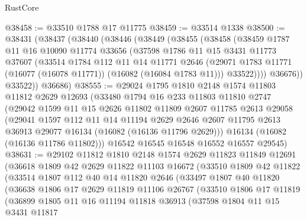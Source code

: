 \begin{lexlean}{RustCore}
\begin{coremodule}
@38458 := @33510 @1788 @17 @11775
@38459 := @33514 @1338
@38500 := @38431
    (@38437
      (@38440
        (@38446
          (@38449
            (@38455
              (@38458
                (@38459
                  @1787
                  @11
                  @16
                  @10090
                  @11774
                  @33656
                  (@37598
                    @1786
                    @11
                    @15
                    @3431
                    @11773
                    @37607
                    (@33514
                      @1784
                      @112
                      @11
                      @14
                      @11771
                      @2646
                      (@29071 @1783 @11771 (@16077 (@16078 @11771)) (@16082 (@16084 @1783 @11)))
                      @33522))))
              @36676))
          @33522))
      @36686)
@38555 := @29024
    @1795
    @1810
    @2148
    @1574
    @11803
    @11812
    @2629
    @12693
    (@33480
      @1794
      @16
      @233
      @11803
      @11810
      @2747
      (@29042
        @1599
        @11
        @15
        @2626
        @11802
        @11809
        @2607
        @11785
        @2613
        @29058
        (@29041
          @1597
          @112
          @11
          @14
          @11194
          @2629
          @2646
          @2607
          @11795
          @2613
          @36913
          @29077
          @16134
          (@16082 (@16136 @11796 @2629)))
        @16134
        (@16082 (@16136 @11786 @11802)))
      @16542
      @16545
      @16548
      @16552
      @16557
      @29545)
@38631 := @29102
    @11812
    @1810
    @2148
    @1574
    @2629
    @11823
    @11849
    @12691
    (@36618
      @1809
      @42
      @2629
      @11822
      @11103
      @16672
      (@33510
        @1809
        @42
        @11822
        (@33514
          @1807
          @112
          @40
          @14
          @11820
          @2646
          (@33497
            @1807
            @40
            @11820
            (@36638
              @1806
              @17
              @2629
              @11819
              @11106
              @26767
              (@33510
                @1806
                @17
                @11819
                (@36899
                  @1805
                  @11
                  @16
                  @11194
                  @11818
                  @36913
                  (@37598
                    @1804
                    @11
                    @15
                    @3431
                    @11817

\end{coremodule}
\end{lexlean}
